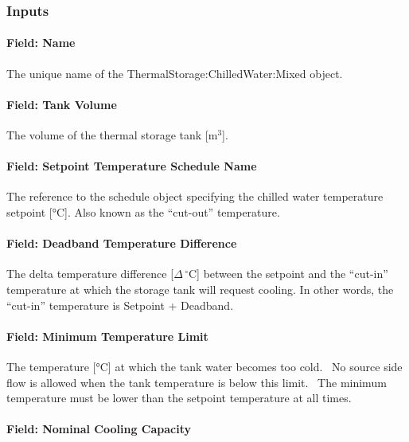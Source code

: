 \subsubsection{Inputs}\label{inputs-22-003}

\paragraph{Field: Name}\label{field-name-22-001}

The unique name of the ThermalStorage:ChilledWater:Mixed object.

\paragraph{Field: Tank Volume}\label{field-tank-volume}

The volume of the thermal storage tank {[}m\(^{3}\){]}.

\paragraph{Field: Setpoint Temperature Schedule Name}\label{field-setpoint-temperature-schedule-name-000}

The reference to the schedule object specifying the chilled water temperature setpoint {[}°C{]}. Also known as the ``cut-out'' temperature.

\paragraph{Field: Deadband Temperature Difference}\label{field-deadband-temperature-difference}

The delta temperature difference {[}\(\Delta\,^{\circ}\mathrm{C}\){]} between the setpoint and the ``cut-in'' temperature at which the storage tank will request cooling. In other words, the ``cut-in'' temperature is Setpoint + Deadband.

\paragraph{Field: Minimum Temperature Limit}\label{field-minimum-temperature-limit}

The temperature {[}°C{]} at which the tank water becomes too cold.~ No source side flow is allowed when the tank temperature is below this limit.~ The minimum temperature must be lower than the setpoint temperature at all times.

\paragraph{Field: Nominal Cooling Capacity}\label{field-nominal-cooling-capacity-2}

